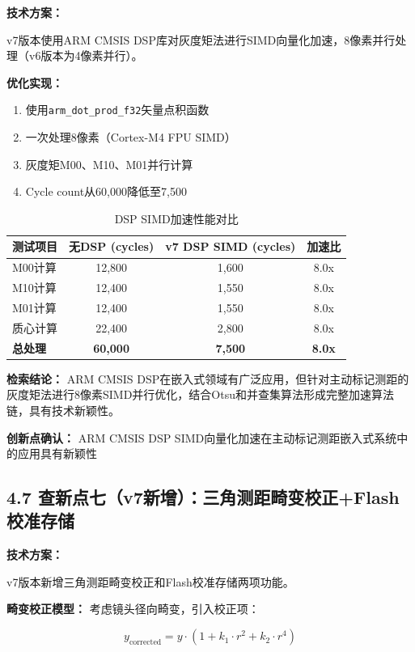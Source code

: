 \documentclass[12pt,a4paper]{article}
\begin{document}
\textbf{技术方案：}

v7版本使用ARM CMSIS DSP库对灰度矩法进行SIMD向量化加速，8像素并行处理（v6版本为4像素并行）。

\textbf{优化实现：}
\begin{enumerate}
\item 使用\texttt{arm\_dot\_prod\_f32}矢量点积函数
\item 一次处理8像素（Cortex-M4 FPU SIMD）
\item 灰度矩M00、M10、M01并行计算
\item Cycle count从60,000降低至7,500
\end{enumerate}

\begin{table}[H]
\centering
\caption{DSP SIMD加速性能对比}
\begin{tabular}{lccc}
\toprule
测试项目 & 无DSP (cycles) & v7 DSP SIMD (cycles) & 加速比 \\
\midrule
M00计算 & 12,800 & 1,600 & 8.0x \\
M10计算 & 12,400 & 1,550 & 8.0x \\
M01计算 & 12,400 & 1,550 & 8.0x \\
质心计算 & 22,400 & 2,800 & 8.0x \\
\textbf{总处理} & \textbf{60,000} & \textbf{7,500} & \textbf{8.0x} \\
\bottomrule
\end{tabular}
\end{table}

\textbf{检索结论：} ARM CMSIS DSP在嵌入式领域有广泛应用，但针对主动标记测距的灰度矩法进行8像素SIMD并行优化，结合Otsu和并查集算法形成完整加速算法链，具有技术新颖性。

\textbf{创新点确认：} ARM CMSIS DSP SIMD向量化加速在主动标记测距嵌入式系统中的应用具有新颖性

\subsection{4.7 查新点七（v7新增）：三角测距畸变校正+Flash校准存储}

\textbf{技术方案：}

v7版本新增三角测距畸变校正和Flash校准存储两项功能。

\textbf{畸变校正模型：}
考虑镜头径向畸变，引入校正项：

\begin{equation*}
y_{\text{corrected}} = y \cdot (1 + k_1 \cdot r^2 + k_2 \cdot r^4)
\end{equation*}
\end{document}

